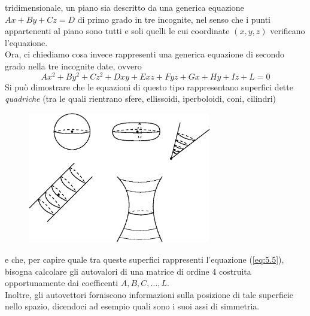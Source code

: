 \documentclass{book}
\begin{document}
\begin{enumerate}
  tridimensionale, un piano sia descritto da una generica equazione $Ax+By+Cz=D$ di primo grado in tre incognite,
  nel senso che i punti appartenenti al piano sono tutti e soli quelli le cui coordinate $(x,y,z)$ verificano
  l'equazione.\\
  Ora, ci chiediamo cosa invece rappresenti una generica equazione di secondo grado nella tre incognite date,
  ovvero
  \begin{equation}
    \label{eq:5.5}
    Ax^2+By^2+Cz^2+Dxy+Exz+Fyz+Gx+Hy+Iz+L=0
  \end{equation}
  Si può dimostrare che le equazioni di questo tipo rappresentano superfici dette \emph{quadriche} (tra le quali
  rientrano sfere, ellissoidi, iperboloidi, coni, cilindri)
  \clearpage
  \begin{figure}[ht]
    \centering
    \includegraphics[width=8cm]{img/finiti/imgex5-1-3.eps}
  \end{figure}

  e che, per capire quale tra queste superfici rappresenti l'equazione (\ref{eq:5.5}), bisogna calcolare gli
  autovalori di una matrice di ordine 4 costruita opportunamente dai coefficenti $A,B,C,\dots,L$. \\
  Inoltre, gli autovettori forniscono informazioni sulla posizione di tale superficie nello spazio, dicendoci ad
  esempio quali sono i suoi assi di simmetria.
 
\end{enumerate}
\end{document}
